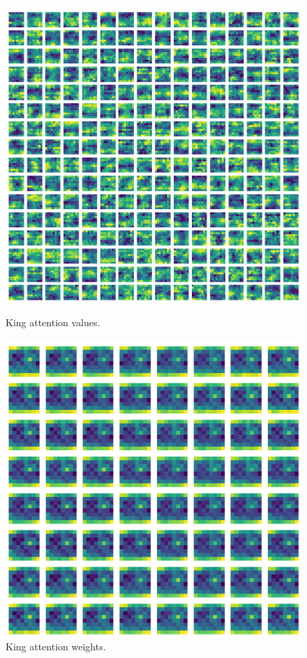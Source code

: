 \begin{figure}[H]
  \begin{minipage}{0.475\textwidth}
    \centering
    \includegraphics[width=\textwidth]{project/img/attention_maps/K_attention_0.png}
    \caption{King attention values.}
    \label{atnK}
  \end{minipage}
  \hspace{0.05\textwidth}
  \begin{minipage}{0.475\textwidth}
    \centering
    \includegraphics[width=\textwidth]{project/img/attention_maps/K_weights_0.png}
    \caption{King attention weights.}
    \label{atnK1}
  \end{minipage}
\end{figure}

